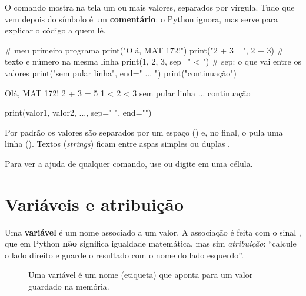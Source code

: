 O comando  mostra na tela um ou mais valores, separados por vírgula. Tudo que vem depois do
símbolo \py{#} é um \textbf{comentário}: o Python ignora, mas serve para explicar o código a quem lê.

\begin{entrada}
# meu primeiro programa
print("Olá, MAT 172!")
print("2 + 3 =", 2 + 3)       # texto e número na mesma linha
print(1, 2, 3, sep=" < ")     # sep: o que vai entre os valores
print("sem pular linha", end=" ... ")
print("continuação")
\end{entrada}
\begin{saida}
Olá, MAT 172!
2 + 3 = 5
1 < 2 < 3
sem pular linha ... continuação
\end{saida}

\begin{sintaxe}
print(valor1, valor2, ..., sep=" ", end="\n")
\end{sintaxe}

Por padrão os valores são separados por um espaço () e, no final, o  pula uma linha
(). Textos (\emph{strings}) ficam entre aspas simples  ou duplas .

\begin{dica}
Para ver a ajuda de qualquer comando, use  ou digite  em uma célula.
\end{dica}

\section{Variáveis e atribuição}

Uma \textbf{variável} é um nome associado a um valor. A associação é feita com o sinal \py{=}, que em Python
\textbf{não} significa igualdade matemática, mas sim \emph{atribuição}: ``calcule o lado direito e guarde o
resultado com o nome do lado esquerdo''.

\begin{figure}[ht]
\centering
{}
\caption{Uma variável é um nome (etiqueta) que aponta para um valor guardado na memória.}
\end{figure}

